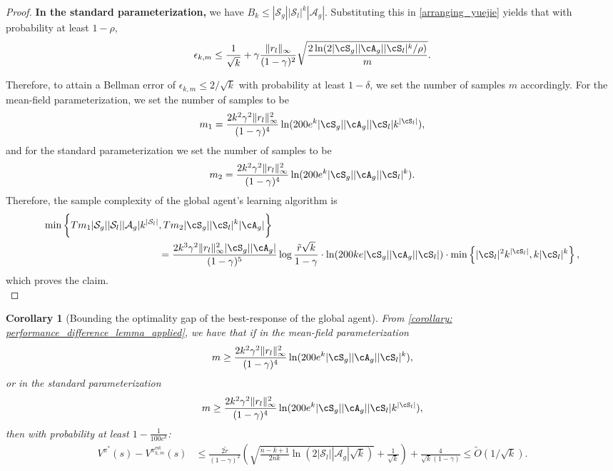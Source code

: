 \documentclass{article}
\theoremstyle{plain}
\newtheorem{corollary}[theorem]{Corollary}
\theoremstyle{definition}
\def\est{\mathrm{est}}
\begin{document}
\begin{proof}
    \textbf{In the standard parameterization,} we have   $B_k \leq |\mathcal{S}_g||\mathcal{S}_l|^k |\mathcal{A}_g|$. Substituting this in \cref{arranging_yuejie} yields that with probability at least $1-\rho$,
    \begin{equation}
        \epsilon_{k,m} \leq \frac{1}{\sqrt{k}}+ \gamma \frac{\|r_l\|_\infty}{(1-\gamma)^2}\sqrt{\frac{2\ln(2|\cS_g||\cA_g||\cS_l|^k /\rho)}{m}}.
    \end{equation}


Therefore, to attain a Bellman error of $\epsilon_{k,m} \leq 2/\sqrt{k}$ with probability at least $1-\delta$, we set the number of samples $m$ accordingly.  For the mean-field parameterization, we set the number of samples to be
\begin{equation}
    m_1 = \frac{2k^2 \gamma^2\|r_l\|^2_\infty}{(1-\gamma)^4} \ln(200e^k |\cS_g||\cA_g| |\cS_l| k^{|\cS_l|}),
\end{equation}
and for the standard parameterization we set the number of samples to be
\[m_2 = \frac{2k^2 \gamma^2\|r_l\|^2_\infty}{(1-\gamma)^4} \ln(200e^k |\cS_g||\cA_g| |\cS_l|^k).\]
Therefore, the sample complexity of the global agent's learning algorithm is \begin{align*}\min\bigg\{Tm_1|\mathcal{S}_g||\mathcal{S}_l||\mathcal{A}_g| k^{|\mathcal{S}_l| } &, T m_2 |\cS_g||\cS_l|^k |\cA_g|\bigg\} \\
&=   \frac{2k^3\gamma^2\|r_l\|^2_\infty |\cS_g| |\cA_g|}{(1-\gamma)^5}\log \frac{\tilde{r}\sqrt{k}}{1-\gamma} \cdot \ln(200ke |\cS_g||\cA_g| |\cS_l|)\cdot \min\left\{|\cS_l|^2  k^{|\cS_l|} ,  k |\cS_l|^k \right\},
\end{align*}
which proves the claim.\qedhere\\
\end{proof}


\begin{corollary}[Bounding the optimality gap of the best-response of the global agent] \label{pdl result in otilde form}
    From \cref{corollary: performance_difference_lemma_applied}, we have that if in the mean-field parameterization \[ m \geq \frac{2k^2 \gamma^2\|r_l\|^2_\infty}{(1-\gamma)^4} \ln(200e^k |\cS_g||\cA_g| |\cS_l|^k),\] 
    or in the standard parameterization 
    \[m \geq  \frac{2k^2 \gamma^2\|r_l\|^2_\infty}{(1-\gamma)^4} \ln(200e^k |\cS_g||\cA_g| |\cS_l| k^{|\cS_l|}),\]
    then with probability at least $1 -\frac{1}{100e^k}$:
    \begin{align*}V^{\pi^*}(s) - V^{{{\pi}}^\est_{k,m}}(s) &\leq \frac{2\tilde{r}}{(1-\gamma)^2}\left(\sqrt{\frac{n-k+1}{2nk} \ln(2|\mathcal{S}_l||\mathcal{A}_g|\sqrt{k})} +  \frac{1}{\sqrt{k}}\right) + \frac{4}{\sqrt{k}(1-\gamma)} \leq \tilde{O}(1/\sqrt{k}).\\
    \end{align*}
\end{corollary}
\end{document}
